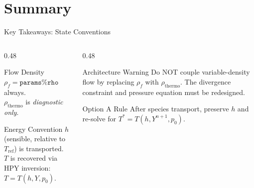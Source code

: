 \documentclass[aspectratio=169,11pt]{beamer}
\begin{document}
\section{Summary}

\begin{frame}{Key Takeaways: State Conventions}
  \begin{columns}[T,totalwidth=\textwidth]
    \begin{column}{0.48\textwidth}
      \begin{block}{Flow Density}
        \(\rho_f = \texttt{params\%rho}\) always.\\[0.3em]
        \(\rho_{\mathrm{thermo}}\) is \emph{diagnostic only}.
      \end{block}
      \begin{block}{Energy Convention}
        \(h\) (sensible, relative to $T_{\mathrm{ref}}$) is transported.\\[0.3em]
        \(T\) is recovered via HPY inversion: $T = T(h,Y,p_0)$.
      \end{block}
    \end{column}
    \begin{column}{0.48\textwidth}
      \begin{alertblock}{Architecture Warning}
        Do NOT couple variable-density flow by replacing $\rho_f$ with $\rho_{\mathrm{thermo}}$. The divergence constraint and pressure equation must be redesigned.
      \end{alertblock}
      \begin{block}{Option A Rule}
        After species transport, preserve $h$ and re-solve for $T^* = T(h, Y^{n+1}, p_0)$.
      \end{block}
    \end{column}
  \end{columns}
\end{frame}
\end{document}

